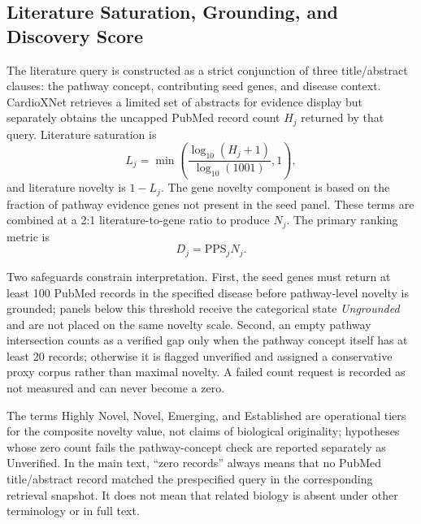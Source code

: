 \documentclass{ieeeaccess}
\begin{document}
\subsection{Literature Saturation, Grounding, and Discovery Score}
The literature query is constructed as a strict conjunction of three title/abstract clauses: the pathway concept, contributing seed genes, and disease context. CardioXNet retrieves a limited set of abstracts for evidence display but separately obtains the uncapped PubMed record count $H_j$ returned by that query. Literature saturation is
\begin{equation}
L_j=\min\left(\frac{\log_{10}(H_j+1)}{\log_{10}(1001)},1\right),
\end{equation}
and literature novelty is $1-L_j$. The gene novelty component is based on the fraction of pathway evidence genes not present in the seed panel. These terms are combined at a 2:1 literature-to-gene ratio to produce $N_j$. The primary ranking metric is
\begin{equation}
D_j=\mathrm{PPS}_jN_j.
\label{eq:discovery}
\end{equation}

Two safeguards constrain interpretation. First, the seed genes must return at least 100 PubMed records in the specified disease before pathway-level novelty is grounded; panels below this threshold receive the categorical state \emph{Ungrounded} and are not placed on the same novelty scale. Second, an empty pathway intersection counts as a verified gap only when the pathway concept itself has at least 20 records; otherwise it is flagged unverified and assigned a conservative proxy corpus rather than maximal novelty. A failed count request is recorded as not measured and can never become a zero.

The terms Highly Novel, Novel, Emerging, and Established are operational tiers for the composite novelty value, not claims of biological originality; hypotheses whose zero count fails the pathway-concept check are reported separately as Unverified. In the main text, ``zero records'' always means that no PubMed title/abstract record matched the prespecified query in the corresponding retrieval snapshot. It does not mean that related biology is absent under other terminology or in full text.
\end{document}
